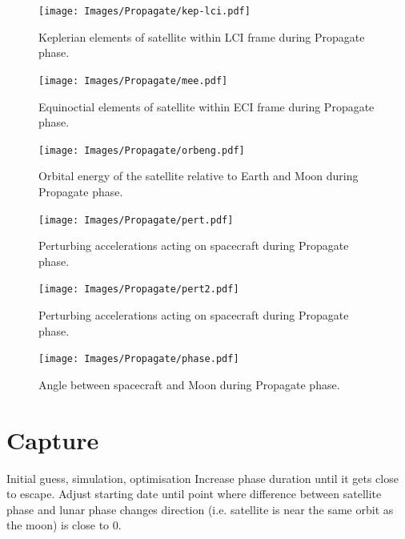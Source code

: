 \begin{figure}
\begin{center}
\texttt{[image: Images/Propagate/kep-lci.pdf]}
\end{center}
\caption{Keplerian elements of satellite within LCI frame during Propagate phase.}
\label{fig:Propagate-kep-lci}
\end{figure}

\begin{figure}
\begin{center}
\texttt{[image: Images/Propagate/mee.pdf]}
\end{center}
\caption{Equinoctial elements of satellite within ECI frame during Propagate phase.}
\label{fig:Propagate-mee}
\end{figure}

\begin{figure}
\begin{center}
\texttt{[image: Images/Propagate/orbeng.pdf]}
\end{center}
\caption{Orbital energy of the satellite relative to Earth and Moon during Propagate phase.}
\label{fig:Propagate-orbeng}
\end{figure}

\begin{figure}
\begin{center}
\texttt{[image: Images/Propagate/pert.pdf]}
\end{center}
\caption{Perturbing accelerations acting on spacecraft during Propagate phase.}
\label{fig:Propagate-pert}
\end{figure}

\begin{figure}
\begin{center}
\texttt{[image: Images/Propagate/pert2.pdf]}
\end{center}
\caption{Perturbing accelerations acting on spacecraft during Propagate phase.}
\label{fig:Propagate-pert2}
\end{figure}

\begin{figure}
\begin{center}
\texttt{[image: Images/Propagate/phase.pdf]}
\end{center}
\caption{Angle between spacecraft and Moon during Propagate phase.}
\label{fig:Propagate-phase}
\end{figure}


\clearpage

\section{Capture}
Initial guess, simulation, optimisation
Increase phase duration until it gets close to escape.
Adjust starting date until point where difference between satellite phase and lunar phase changes direction (i.e. satellite is near the same orbit as the moon) is close to 0\degrees.

